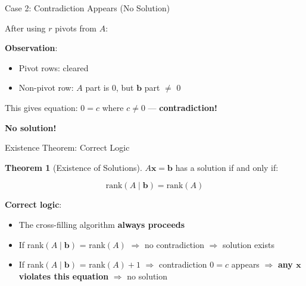 \documentclass[10pt]{beamer}
\theoremstyle{definition}
\newtheorem{thm}{Theorem}[section]
\newcommand{\x}[1]{\alert{\textbf{#1}}}
\begin{document}
\begin{frame}[fragile]{Case 2: Contradiction Appears (No Solution)}

After using $r$ pivots from $A$:

\begin{center}
\end{center}

\vspace{0.5em}

\x{Observation}:
\begin{itemize}
\item Pivot rows: cleared
\item Non-pivot row: $A$ part is 0, but $\mathbf{b}$ part $\neq$ 0
\end{itemize}

This gives equation: $0 = c$ where $c \neq 0$ — \x{contradiction!}

\x{No solution!}

\end{frame}

\begin{frame}{Existence Theorem: Correct Logic}

\begin{thm}[Existence of Solutions]
$A\mathbf{x} = \mathbf{b}$ has a solution if and only if:

$$\text{rank}(A \mid \mathbf{b}) = \text{rank}(A)$$
\end{thm}

\vspace{1em}

\x{Correct logic}:

\begin{itemize}
\item The cross-filling algorithm \textbf{always proceeds}
\item If rank$(A \mid \mathbf{b})$ = rank$(A)$ $\Rightarrow$ no contradiction $\Rightarrow$ solution exists
\item If rank$(A \mid \mathbf{b})$ = rank$(A) + 1$ $\Rightarrow$ contradiction $0 = c$ appears $\Rightarrow$ \textbf{any $\mathbf{x}$ violates this equation} $\Rightarrow$ no solution
\end{itemize}

\end{frame}
\end{document}
